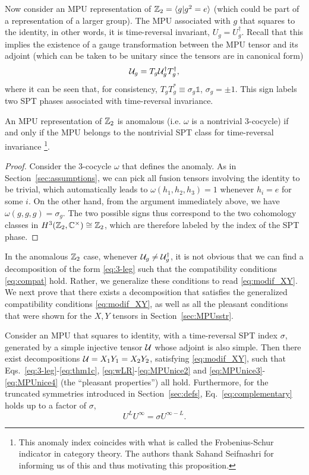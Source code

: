 \documentclass[reprint,
superscriptaddress,
amsmath,amssymb,
notitlepage,
aps,
prb,
10pt, 
tightenlines
]{revtex4-2}
\begin{document}
Now consider an MPU representation of $\mathbb{Z}_2=\langle g|g^2=e\rangle$ (which could be part of a representation of a larger group). The MPU associated with $g$ that squares to the identity, in other words, it is time-reversal invariant, $U_g=U_g^\dagger$. Recall that this implies the existence of a gauge transformation between the MPU tensor and its adjoint (which can be taken to be unitary since the tensors are in canonical form)
\begin{equation}
    \mathcal{U}_g = T_g\mathcal{U}_g^\dagger T_g^\dagger,
\end{equation}
where it can be seen that, for consistency, $T_gT_g^\ast \equiv \sigma_g \mathds{1}$, $\sigma_g=\pm 1$. This sign labels two SPT phases associated with time-reversal invariance.
\begin{appxprop}
    An MPU representation of $\mathbb{Z}_2$ is anomalous (i.e. $\omega$ is a nontrivial 3-cocycle) if and only if the MPU belongs to the nontrivial SPT class for time-reversal invariance \footnote{This anomaly index coincides with what is called the Frobenius-Schur indicator in category theory. The authors thank Sahand Seifnashri for informing us of this and thus motivating this proposition.}.
\end{appxprop}
\begin{proof}
    Consider the 3-cocycle $\omega$ that defines the anomaly. As in Section~\ref{sec:assumptions}, we can pick all fusion tensors involving the identity to be trivial, which automatically leads to $\omega(h_1,h_2,h_3)=1$ whenever $h_i=e$ for some $i$. On the other hand, from the argument immediately above, we have $\omega(g,g,g)=\sigma_g$. The two possible signs thus correspond to the two cohomology classes in $H^3(\mathbb{Z}_2, \mathbb{C}^\times)\cong \mathbb{Z}_2$, which are therefore labeled by the index of the SPT phase.
    \end{proof}
In the anomalous $\mathbb{Z}_2$ case, whenever $\mathcal{U}_g\neq\mathcal{U}^\dagger_g$, it is not obvious that we can find a decomposition of the form \eqref{eq:3-leg} such that the compatibility conditions \eqref{eq:compat} hold. Rather, we generalize these conditions to read \eqref{eq:modif_XY}. We next prove that there exists a decomposition that satisfies the generalized compatibility conditions \eqref{eq:modif_XY}, as well as all the pleasant conditions that were shown for the $X, Y$ tensors in Section~\ref{sec:MPUsstr}.
\begin{appxprop}
    Consider an MPU that squares to identity, with a time-reversal SPT index $\sigma$, generated by a simple injective tensor $\mathcal{U}$ whose adjoint is also simple. Then there exist decompositions $\mathcal{U}=X_1Y_1=X_2Y_2$, satisfying \eqref{eq:modif_XY}, such that Eqs.~\eqref{eq:3-leg}-\eqref{eq:thm1c}, \eqref{eq:wLR}-\eqref{eq:MPUnice2} and \eqref{eq:MPUnice3}-\eqref{eq:MPUnice4} (the ``pleasant properties'') all hold. Furthermore, for the truncated symmetries introduced in Section~\ref{sec:defs}, Eq.~\eqref{eq:complementary} holds up to a factor of $\sigma$,
    \begin{equation}
        U^L U^{\infty} = \sigma U^{\infty - L}.
        \label{eq:UUU}
    \end{equation}
\end{appxprop}
\end{document}
